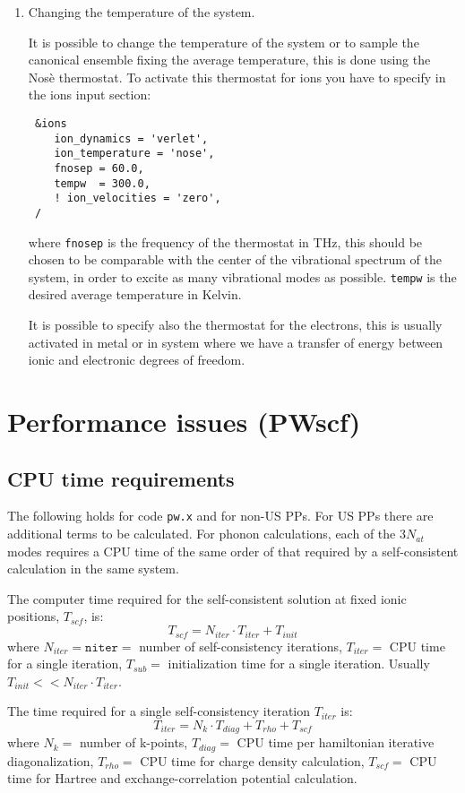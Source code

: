 \documentclass[12pt,a4paper]{article}
\begin{document}
\begin{enumerate}
  \item
    Changing the temperature of the system.

    It is possible to change the temperature of the system or to
    sample the canonical ensemble fixing the average temperature, this
    is done using the Nos\`e thermostat.
    To activate this thermostat for ions you have to specify in the
    ions input section:
\begin{verbatim}
 &ions
    ion_dynamics = 'verlet',
    ion_temperature = 'nose',
    fnosep = 60.0,
    tempw  = 300.0,
    ! ion_velocities = 'zero',
 /
\end{verbatim}
    where \texttt{fnosep} is the frequency of the thermostat in THz,
    this should be chosen to be comparable with the center of the
    vibrational spectrum of the system, in order to excite as many
    vibrational modes as possible.
    \texttt{tempw} is the desired average temperature in Kelvin.

    It is possible to specify also the thermostat for the electrons,
    this is usually activated in metal or in system where we have a
    transfer of energy between ionic and electronic degrees of
    freedom.
\end{enumerate}

\clearpage

\section{Performance issues (PWscf)}
  \label{performance}

\subsection{CPU time requirements}

The following holds for code {\tt pw.x} and for non-US PPs. 
For US PPs there are additional terms to be calculated.
For phonon calculations, each of the $3 N_{at}$ modes requires a CPU
time of the same order of that required by a self-consistent 
calculation in the same system.

The computer time required for the self-consistent solution at fixed
ionic positions, $T_{scf}$, is:
$$
T_{scf} = N_{iter} \cdot T_{iter} + T_{init}
$$
where $N_{iter}=\mathtt{niter}=$ number of self-consistency
iterations, $T_{iter}=$ CPU time for a single iteration,
$T_{sub}=$ initialization time for a single iteration. 
Usually $T_{init} << N_{iter} \cdot T_{iter}$.

The time required for a single self-consistency iteration
$T_{iter}$ is:
$$
T_{iter} = N_k \cdot T_{diag} + T_{rho} + T_{scf}
$$
where $N_k=$ number of k-points, $T_{diag}=$ CPU time per hamiltonian
iterative diagonalization, $T_{rho}=$ CPU time for charge density
calculation, $T_{scf}=$ CPU time for Hartree and exchange-correlation
potential calculation.
\end{document}
